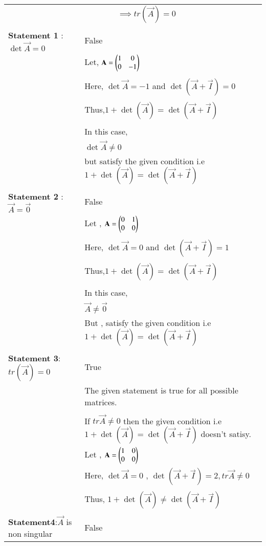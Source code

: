 \documentclass[journal,12pt]{IEEEtran}
\begin{document}
\begin{longtable}{|p{5cm}|p{13cm}|}
    &$\qquad\qquad\implies\boxed{ tr(\vec{A})=0}$\\
    &\\
    \hline
    \multirow{3}{*}{\textbf{Statement 1} : $\det\vec{A}=0$ } 
	& \\
	& False\\
	\hline
	&\\
	& Let, $\mathbf{A}=\begin{pmatrix}1&0\\0&-1\end{pmatrix}$\\
	&\\
	& Here, $\det{\vec{A}}=-1$ and $\det(\vec{A}+\vec{I})=0$\\
	&\\
	& Thus,$1+\det(\vec{A})=\det(\vec{A}+\vec{I})$\\
	&\\
	& In this case, \\
	& $\det\vec{A}\neq 0$\\ 
	&but satisfy the given condition i.e $1+\det(\vec{A})=\det(\vec{A}+\vec{I})$\\ 
	&\\
	\hline
	\multirow{3}{*}{\textbf{Statement 2} : $\vec{A}=\vec{0}$} & \\
	& False\\
	\hline
	&\\
	& Let , $\mathbf{A}= \begin{pmatrix}0&1\\0&0\end{pmatrix}$\\
	&\\
	& Here, $\det{\vec{A}}=0$ and $\det(\vec{A}+\vec{I})=1$\\
	&\\
	& Thus,$1+\det(\vec{A})=\det(\vec{A}+\vec{I})$\\
	&\\
	& In this case, \\
	& $\vec{A}\neq \vec{0}$\\ 
	& But , satisfy the given condition i.e $ 1+\det(\vec{A})=\det(\vec{A}+\vec{I})$\\
	&\\
	\hline
	\multirow{3}{*}{\textbf{Statement 3}: $tr(\vec{A})=0$}&\\
    & True\\
	\hline
	&\\
	& The given statement is true for all possible matrices.\\
	&\\
	& If $tr\vec{A}\neq0$ then the given condition i.e $1
	+\det(\vec{A})=\det(\vec{A}+\vec{I})$ doesn't satisy.\\
	& Let , $\mathbf{A}= \begin{pmatrix}1&0\\0&0\end{pmatrix}$\\
	\hline
	& Here, $\det{\vec{A}}=0$ , $\det(\vec{A}+\vec{I})=2 , tr{\vec{A}} \neq 0$\\
	&\\
	& Thus, $ 1+\det(\vec{A})\neq\det(\vec{A}+\vec{I})$\\
	&\\
	\hline
	\multirow{3}{*}{\textbf{Statement4}:$\vec{A}$ is non singular} &\\
    & False\\
	\hline
	&\\


\end{longtable}
\end{document}
